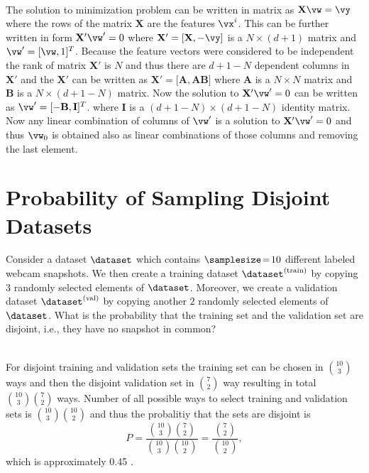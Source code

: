 \documentclass[article,11pt]{article}
\begin{document}
\\
The solution to minimization problem can be written in matrix as $\mathbf{X}\vw=\vy$ where the rows of the matrix $\mathbf{X}$ are the features $\vx^i$. This
can be further written in form $\mathbf{X}'\vw'=0$ where $\mathbf{X}'=\lbrack\mathbf{X}, -\vy\rbrack$ is a $N\times (d+1)$ matrix and
$\vw'=\lbrack\vw,1\rbrack^T$. Because the feature vectors were considered to
be independent the rank of matrix $\mathbf{X}'$ is $N$ and thus there are
$d+1-N$ dependent columns in $\mathbf{X}'$ and the $\mathbf{X}'$ can be written
as $\mathbf{X'}=\lbrack\mathbf{A}, \mathbf{A}\mathbf{B}\rbrack$ where
$\mathbf{A}$ is a $N\times N$ matrix and $\mathbf{B}$ is a $N\times(d+1-N)$
matrix. Now the solution to $\mathbf{X}'\vw'=0$ can be written as $\vw' =
\lbrack\mathbf{-B},\mathbf{I}\rbrack^T$. where $\mathbf{I}$ is a $(d+1-N)\times(d+1-N)$ identity matrix. Now any linear combination of columns of $\vw'$ is a
solution to $\mathbf{X'}\vw'=0$ and thus $\vw_0$ is obtained also as linear combinations of those columns and removing the last element.


\newpage

\section{Probability of Sampling Disjoint Datasets}
Consider a dataset $\dataset$ which contains $\samplesize\!=\!10$ different labeled webcam snapshots. We then create a 
training dataset $\dataset^{(\rm train)}$ by copying $3$ randomly selected elements of $\dataset$. Moreover, we create 
a validation dataset $\dataset^{(\rm val)}$ by copying another $2$ randomly selected elements of $\dataset$. 
What is the probability that the training set and the validation set are disjoint, i.e., they have no snapshot in common?

\\
For disjoint training and validation sets the training set can be chosen in
$\binom{10}{3}$ ways and then the disjoint validation set in $\binom{7}{2}$ way resulting in total $\binom{10}{3}\binom{7}{2}$ ways. Number of all
possible ways to select training and validation sets is $\binom{10}{3}\binom{10}{2}$ and thus the probalitiy that the sets are disjoint is
\begin{equation}
  P=\frac{\binom{10}{3}\binom{7}{2}}{\binom{10}{3}\binom{10}{2}}=\frac{\binom{7}{2}}{\binom{10}{2}},
\end{equation}
which is approximately 0.45 .
\end{document}
